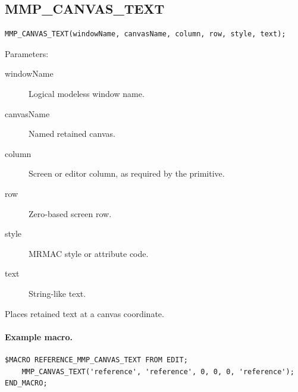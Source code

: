 \documentclass[a4paper,10pt,twoside,openany]{book}
\newenvironment{mrmacextension}{\begin{changebar}}{\end{changebar}}
\begin{document}
\begin{mrmacextension}
\label{prim:procedure-mmp-canvas-text}
\subsection*{MMP\_CANVAS\_TEXT}
\begin{verbatim}
MMP_CANVAS_TEXT(windowName, canvasName, column, row, style, text);
\end{verbatim}
Parameters:
\begin{description}
\item[windowName] Logical modeless window name.
\item[canvasName] Named retained canvas.
\item[column] Screen or editor column, as required by the primitive.
\item[row] Zero-based screen row.
\item[style] MRMAC style or attribute code.
\item[text] String-like text.
\end{description}

Places retained text at a canvas coordinate.

\paragraph{Example macro.}
\begin{verbatim}
$MACRO REFERENCE_MMP_CANVAS_TEXT FROM EDIT;
    MMP_CANVAS_TEXT('reference', 'reference', 0, 0, 0, 'reference');
END_MACRO;
\end{verbatim}
\end{mrmacextension}
\end{document}
